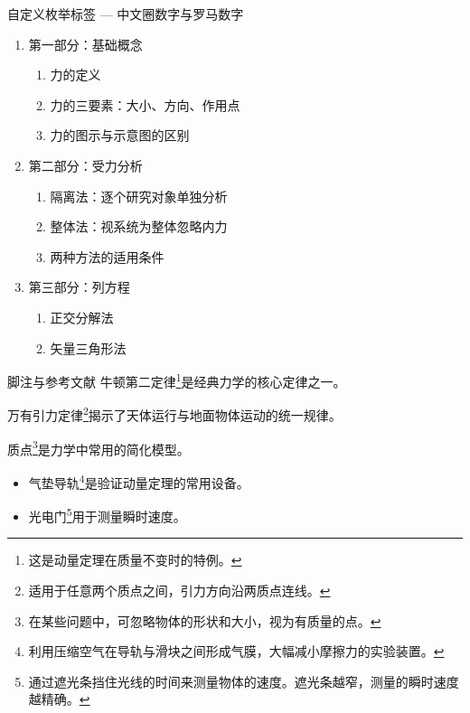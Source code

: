 \documentclass[darkmode=false, randomquote=true, quoteseed=2026, shownav=false,handout=false]{HiBeamer}
\begin{document}
\begin{frame}{自定义枚举标签 --- 中文圈数字与罗马数字}
  \begin{enumerate}
    \item[Ⅰ.] 第一部分：基础概念
    \begin{enumerate}
      \item[①] 力的定义
      \item[②] 力的三要素：大小、方向、作用点
      \item[③] 力的图示与示意图的区别
    \end{enumerate}
    \item[Ⅱ.] 第二部分：受力分析
    \begin{enumerate}
      \item[①] 隔离法：逐个研究对象单独分析
      \item[②] 整体法：视系统为整体忽略内力
      \item[③] 两种方法的适用条件
    \end{enumerate}
    \item[Ⅲ.] 第三部分：列方程
    \begin{enumerate}
      \item[①] 正交分解法
      \item[②] 矢量三角形法
    \end{enumerate}
  \end{enumerate}
\end{frame}

\begin{frame}{脚注与参考文献}
  牛顿第二定律\footnote{这是动量定理在质量不变时的特例。}是经典力学的核心定律之一。

  万有引力定律\footnote{适用于任意两个质点之间，引力方向沿两质点连线。}揭示了天体运行与地面物体运动的统一规律。

  质点\footnote{在某些问题中，可忽略物体的形状和大小，视为有质量的点。}是力学中常用的简化模型。

  \begin{itemize}
    \item 气垫导轨\footnote{利用压缩空气在导轨与滑块之间形成气膜，大幅减小摩擦力的实验装置。}是验证动量定理的常用设备。
    \item 光电门\footnote{通过遮光条挡住光线的时间来测量物体的速度。遮光条越窄，测量的瞬时速度越精确。}用于测量瞬时速度。
  \end{itemize}
\end{frame}

\end{document}

